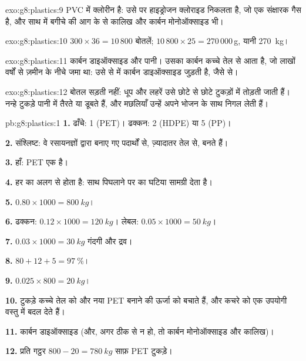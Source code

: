\begin{solution}{exo:g8:plastics:9}
PVC में क्लोरीन है: उसे  पर हाइड्रोजन क्लोराइड निकलता है, जो एक
संक्षारक गैस है, और साथ में बगीचे की आग के  से कालिख और कार्बन
मोनोऑक्साइड भी।
\end{solution}

\begin{solution}{exo:g8:plastics:10}
$300 \times 36 = 10\,800$ बोतलें; $10\,800 \times 25 = 270\,000$\,g, यानी
\qty{270}{kg}।
\end{solution}

\begin{solution}{exo:g8:plastics:11}
कार्बन डाइऑक्साइड और पानी। उसका कार्बन कच्चे तेल से आता है, जो लाखों वर्षों
से ज़मीन के नीचे जमा था: उसे  से  में कार्बन डाइऑक्साइड जुड़ती है,
जैसे   से।
\end{solution}

\begin{solution}{exo:g8:plastics:12}
बोतल सड़ती नहीं: धूप और लहरें उसे छोटे से छोटे टुकड़ों में तोड़ती जाती हैं।
नन्हे टुकड़े पानी में तैरते या डूबते हैं, और मछलियाँ उन्हें अपने भोजन के साथ
निगल लेती हैं।
\end{solution}

\begin{solution}{pb:g8:plastics:1}
\textbf{1.} ढाँचे: 1 (PET)। ढक्कन: 2 (HDPE) या 5 (PP)।

\textbf{2.} संश्लिष्ट: वे रसायनज्ञों द्वारा बनाए गए पदार्थों से, ज़्यादातर
तेल से, बनते हैं।

\textbf{3.} हाँ: PET एक  है।

\textbf{4.} हर  का  अलग से होता है: साथ पिघलाने पर 
का  घटिया सामग्री देता है।

\textbf{5.} $0.80 \times 1000 = \qty{800}{kg}$।

\textbf{6.} ढक्कन: $0.12 \times 1000 = \qty{120}{kg}$। लेबल: $0.05
\times 1000 = \qty{50}{kg}$।

\textbf{7.} $0.03 \times 1000 = \qty{30}{kg}$ गंदगी और द्रव।

\textbf{8.} $80 + 12 + 5 = \qty{97}{\percent}$।

\textbf{9.} $0.025 \times 800 = \qty{20}{kg}$।

\textbf{10.} टुकड़े कच्चे तेल को और नया PET बनाने की ऊर्जा को बचाते हैं,
और कचरे को एक उपयोगी वस्तु में बदल देते हैं।

\textbf{11.} कार्बन डाइऑक्साइड (और, अगर  ठीक से न हो, तो कार्बन
मोनोऑक्साइड और कालिख)।

\textbf{12.} प्रति गट्ठर $800 - 20 = \qty{780}{kg}$ साफ़ PET टुकड़े।
\end{solution}
